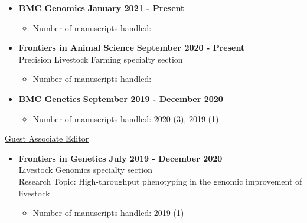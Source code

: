 \documentclass[margin,line,10pt]{res}
\begin{document}
\begin{resume}


\begin{itemize}
\item {\bf BMC Genomics} \hfill {\bf January 2021 - Present}
  \begin{itemize}
    \item Number of manuscripts handled:
  \end{itemize}
\end{itemize}

\vspace{0.3cm}

\begin{itemize}
\item {\bf Frontiers in Animal Science} \hfill {\bf September 2020 - Present} \\
   Precision Livestock Farming specialty section
  \begin{itemize}
    \item Number of manuscripts handled: 
  \end{itemize}
\end{itemize}

\vspace{0.3cm}

\begin{itemize}
\item {\bf BMC Genetics} \hfill {\bf September 2019 - December 2020}
  \begin{itemize}
    \item Number of manuscripts handled: 2020 (3), 2019 (1)
  \end{itemize}
\end{itemize}

\vspace{0.3cm}

\underline{Guest Associate Editor}
\vspace{0.2cm}
\begin{itemize}
\item {\bf Frontiers in Genetics} \hfill  {\bf July 2019 - December 2020} \\
  Livestock Genomics specialty section \\
  Research Topic: High-throughput phenotyping in the genomic improvement of livestock
  \begin{itemize}
    \item Number of manuscripts handled: 2019 (1)
  \end{itemize}
\end{itemize}
\vspace{0.3cm}


\end{resume}
\end{document}
